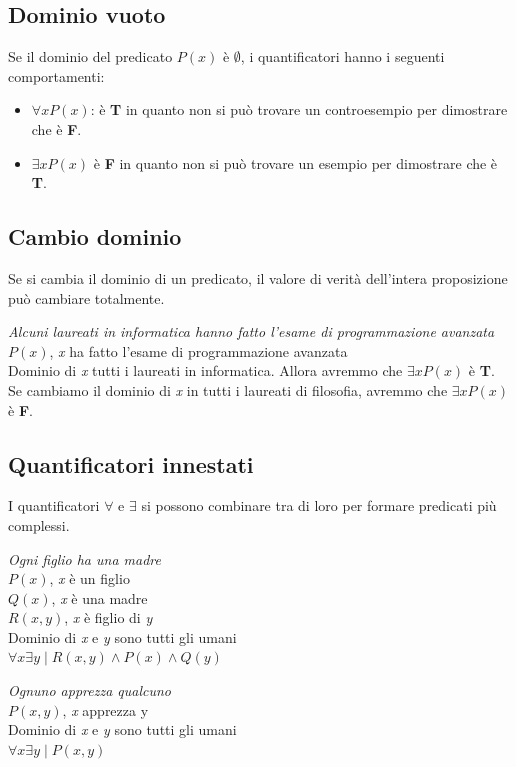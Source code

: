 \subsection{Dominio vuoto}
Se il dominio del predicato $P(x)$ è $\emptyset$, i quantificatori hanno i seguenti comportamenti: 
\begin{itemize}
    \item $\forall xP(x)$: è \textbf{T} in quanto non si può trovare un controesempio per dimostrare che è \textbf{F}.
    \item $\exists xP(x)$ è \textbf{F} in quanto non si può trovare un esempio per dimostrare che è \textbf{T}.
\end{itemize}

\subsection{Cambio dominio}
Se si cambia il dominio di un predicato, il valore di verità dell'intera proposizione può cambiare totalmente.
\begin{example}
\emph{Alcuni laureati in informatica hanno fatto l'esame di programmazione avanzata} \\
$P(x)$, \textit{x} ha fatto l'esame di programmazione avanzata \\
Dominio di \textit{x} tutti i laureati in informatica.
Allora avremmo che $\exists xP(x)$ è \textbf{T}. \\
Se cambiamo il dominio di \textit{x} in tutti i laureati di filosofia, avremmo che  $\exists xP(x)$ è \textbf{F}.
\end{example}

\subsection{Quantificatori innestati}
I quantificatori $\forall$ e $\exists$ si possono combinare tra di loro per formare predicati più complessi.
\begin{example}
\emph{Ogni figlio ha una madre} \\
$P(x)$, \textit{x} è un figlio \\
$Q(x)$, \textit{x} è una madre \\
$R(x, y)$, \textit{x} è figlio di \textit{y} \\
Dominio di \textit{x} e \textit{y} sono tutti gli umani \\
$\forall x \exists y \mid R(x, y) \wedge P(x) \wedge Q(y)$
\end{example}
\begin{example}
\emph{Ognuno apprezza qualcuno} \\
$P(x, y)$, \textit{x} apprezza y \\
Dominio di \textit{x} e \textit{y} sono tutti gli umani \\
$\forall x \exists y \mid P(x, y)$
\end{example}

